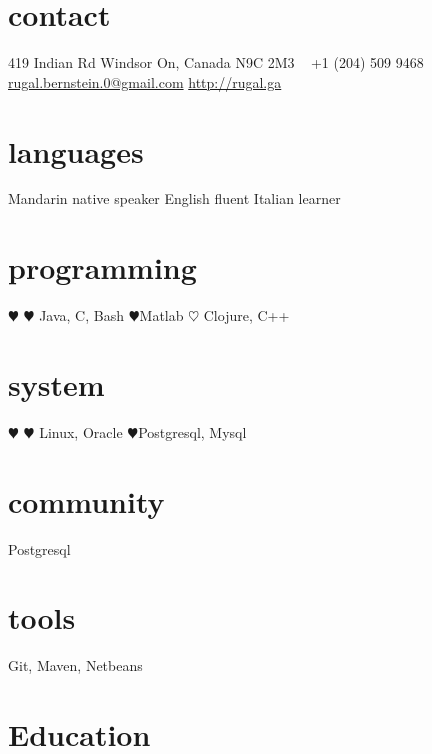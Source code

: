 \documentclass[]{friggeri-cv} %
\begin{document}


\begin{aside} %
\section{contact}
419 Indian Rd
Windsor On, Canada
N9C 2M3
~
+1 (204) 509 9468
~
\href{mailto:rugal.bernstein.0@gmail.com}{rugal.bernstein.0@gmail.com}
\href{http://rugal.ga}{http://rugal.ga}
\section{languages}
Mandarin native speaker
English fluent
Italian learner
\section{programming}
{\color{red} $\varheartsuit$}{\color{red} $\varheartsuit$} Java, C, Bash
{\color{red} $\varheartsuit$}Matlab
$\heartsuit$ Clojure, C++
\section{system}
{\color{red} $\varheartsuit$}{\color{red} $\varheartsuit$} Linux, Oracle
{\color{red} $\varheartsuit$}Postgresql, Mysql
\section{community}
Postgresql
\section{tools}
Git, Maven, Netbeans
\end{aside}
\section{Education}
\end{document}

